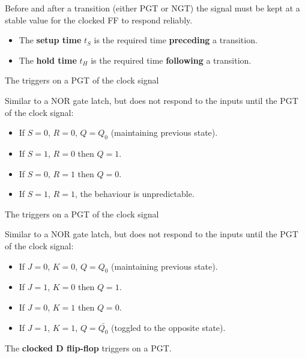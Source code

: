     \par Before and after a transition (either PGT or NGT) the signal
    must be kept at a stable value for the clocked FF to respond reliably.
    \begin{itemize}
      \item The \textbf{setup time} $t_{S}$ is the required time
        \textbf{preceding} a transition.
      \item The \textbf{hold time} $t_{H}$ is the required time
        \textbf{following} a transition.
    \end{itemize}


    \par The  triggers on a PGT of the clock signal

    \par Similar to a NOR gate latch, but does not respond to the inputs until
      the PGT of the clock signal:
    \begin{itemize}
      \item If $S = 0$, $R = 0$, $Q = Q_{0}$ (maintaining previous state).
      \item If $S = 1$, $R = 0$ then $Q = 1$.
      \item If $S = 0$, $R = 1$ then $Q = 0$.
      \item If $S = 1$, $R = 1$, the behaviour is unpredictable.
  \end{itemize}


    \par The  triggers on a PGT of the clock signal

    \par Similar to a NOR gate latch, but does not respond to the inputs until
      the PGT of the clock signal:
    \begin{itemize}
      \item If $J = 0$, $K = 0$, $Q = Q_{0}$ (maintaining previous state).
      \item If $J = 1$, $K = 0$ then $Q = 1$.
      \item If $J = 0$, $K = 1$ then $Q = 0$.
      \item If $J = 1$, $K = 1$, $Q = \bar{Q_{0}}$ (toggled to the opposite
      state).
  \end{itemize}


    \par The \textbf{clocked D flip-flop} triggers on a PGT.

